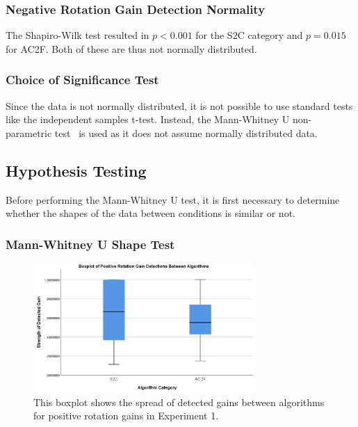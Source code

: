 \subsubsection{Negative Rotation Gain Detection Normality}
The Shapiro-Wilk test resulted in $p < 0.001$ for the S2C category and $p = 0.015$ for AC2F. Both of these are thus not normally distributed.  

\subsubsection{Choice of Significance Test}
Since the data is not normally distributed, it is not possible to use standard tests like the independent samples t-test. Instead, the Mann-Whitney U non-parametric test~\cite{MWUTest} is used as it does not assume normally distributed data. 
   
\subsection{Hypothesis Testing}
Before performing the Mann-Whitney U test, it is first necessary to determine whether the shapes of the data between conditions is similar or not. 
\subsubsection{Mann-Whitney U Shape Test}
\begin{figure}[tbph]
    \centering
    \includegraphics[width=0.75\textwidth]{figures/graphs/PosRotationDetectionBoxplot.png}
    \caption[Boxplot on Positive Rotation Detections in Experiment 1]{This boxplot shows the spread of detected gains between algorithms for positive rotation gains in Experiment 1.}
    \label{fig:posRotEx1Boxplot}
\end{figure}

